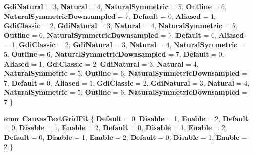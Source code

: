\begin{DoxyCompactItemize}
{\bfseries Gdi\+Natural} = 3, 
\newline
{\bfseries Natural} = 4, 
{\bfseries Natural\+Symmetric} = 5, 
{\bfseries Outline} = 6, 
{\bfseries Natural\+Symmetric\+Downsampled} = 7, 
\newline
{\bfseries Default} = 0, 
{\bfseries Aliased} = 1, 
{\bfseries Gdi\+Classic} = 2, 
{\bfseries Gdi\+Natural} = 3, 
\newline
{\bfseries Natural} = 4, 
{\bfseries Natural\+Symmetric} = 5, 
{\bfseries Outline} = 6, 
{\bfseries Natural\+Symmetric\+Downsampled} = 7, 
\newline
{\bfseries Default} = 0, 
{\bfseries Aliased} = 1, 
{\bfseries Gdi\+Classic} = 2, 
{\bfseries Gdi\+Natural} = 3, 
\newline
{\bfseries Natural} = 4, 
{\bfseries Natural\+Symmetric} = 5, 
{\bfseries Outline} = 6, 
{\bfseries Natural\+Symmetric\+Downsampled} = 7, 
\newline
{\bfseries Default} = 0, 
{\bfseries Aliased} = 1, 
{\bfseries Gdi\+Classic} = 2, 
{\bfseries Gdi\+Natural} = 3, 
\newline
{\bfseries Natural} = 4, 
{\bfseries Natural\+Symmetric} = 5, 
{\bfseries Outline} = 6, 
{\bfseries Natural\+Symmetric\+Downsampled} = 7, 
\newline
{\bfseries Default} = 0, 
{\bfseries Aliased} = 1, 
{\bfseries Gdi\+Classic} = 2, 
{\bfseries Gdi\+Natural} = 3, 
\newline
{\bfseries Natural} = 4, 
{\bfseries Natural\+Symmetric} = 5, 
{\bfseries Outline} = 6, 
{\bfseries Natural\+Symmetric\+Downsampled} = 7
 \}
\item 
\mbox{\label{namespace_microsoft_1_1_graphics_1_1_canvas_1_1_text_a7077d2f1ea9a72f9af3d69e5f5e04c20}} 
enum {\bfseries Canvas\+Text\+Grid\+Fit} \{ \newline
{\bfseries Default} = 0, 
{\bfseries Disable} = 1, 
{\bfseries Enable} = 2, 
{\bfseries Default} = 0, 
\newline
{\bfseries Disable} = 1, 
{\bfseries Enable} = 2, 
{\bfseries Default} = 0, 
{\bfseries Disable} = 1, 
\newline
{\bfseries Enable} = 2, 
{\bfseries Default} = 0, 
{\bfseries Disable} = 1, 
{\bfseries Enable} = 2, 
\newline
{\bfseries Default} = 0, 
{\bfseries Disable} = 1, 
{\bfseries Enable} = 2
 \}
\item 
\mbox{\label{namespace_microsoft_1_1_graphics_1_1_canvas_1_1_text_a70ea121d1ef956464e4adf30172f2a87}} 

\end{DoxyCompactItemize}
